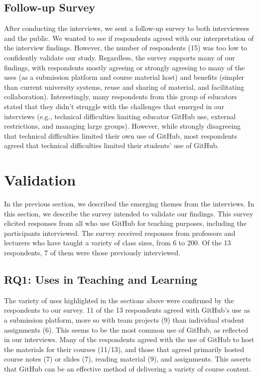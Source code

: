 \subsection{Follow-up Survey}
After conducting the interviews, we sent a follow-up survey to both interviewees and the public. We wanted to see if respondents agreed with our interpretation of the interview findings. However, the number of respondents (15) was too low to confidently validate our study. Regardless, the survey supports many of our findings, with respondents mostly agreeing or strongly agreeing to many of the uses (as a submission platform and course material host) and benefits (simpler than current university systems, reuse and sharing of material, and facilitating collaboration). Interestingly, many respondents from this group of educators stated that they didn't struggle with the challenges that emerged in our interviews (e.g., technical difficulties limiting educator GitHub use, external restrictions, and managing large groups). However, while strongly disagreeing that technical difficulties limited their own use of GitHub, most respondents agreed that technical difficulties limited their students' use of GitHub.

\section{Validation}
\label{sec:validation survey}
In the previous section, we described the emerging themes from the interviews. In this section, we describe the survey intended to validate our findings. This survey elicited responses from all who use GitHub for teaching purposes, including the participants interviewed. The survey received responses from professors and lecturers who have taught a variety of class sizes, from 6 to 200. Of the 13 respondents, 7 of them were those previously interviewed.


\subsection{RQ1: Uses in Teaching and Learning}
The variety of uses highlighted in the sections above were confirmed by the respondents to our survey. 11 of the 13 respondents agreed with GitHub's use as a submission platform, more so with team projects (9) than individual student assignments (6). This seems to be the most common use of GitHub, as reflected in our interviews. Many of the respondents agreed with the use of GitHub to host the materials for their courses (11/13), and those that agreed primarily hosted course notes (7) or slides (7), reading material (9), and assignments. This asserts that GitHub can be an effective method of delivering a variety of course content.

